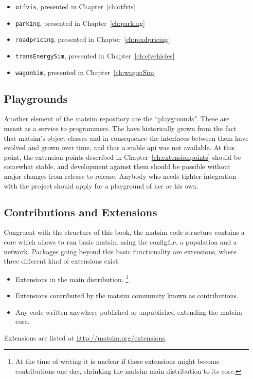 \begin{itemize}
\item \lstinline{otfvis}, presented in Chapter~\ref{ch:otfvis}
\item \lstinline{parking}, presented in Chapter~\ref{ch:parking}
\item \lstinline{roadpricing}, presented in Chapter~\ref{ch:roadpricing}
\item \lstinline{transEnergySim}, presented in Chapter~\ref{ch:elvehicles}
\item \lstinline{wagonSim}, presented in Chapter~\ref{ch:wagonSim}
\end{itemize}


\subsection{Playgrounds}
Another element of the \gls{matsim} repository are the ``playgrounds''. 
These are meant as a service to programmers. 
The have historically grown from the fact that \gls{matsim}'s object classes and in consequence the interfaces between them have evolved and grown over time, and thus a stable \gls{api} was not available.  
At this point, the extension points described in Chapter~\ref{ch:extensionpoints} should be somewhat stable, and development against them should be possible without major changes from release to release.  
Anybody who needs tighter integration with the project should apply for a playground of her or his own.

\subsection{Contributions and Extensions}
Congruent with the structure of this book, the \gls{matsim} code structure contains a core which allows to run basic \gls{matsim} using the \gls{configfile}, a population and a network. Packages going beyond this basic functionality are \glspl{extension}, where three different kind of extensions exist:
\begin{itemize}\styleItemize 
\item Extensions in the main distribution.%
\footnote{At the time of writing it is unclear if these extensions might become \glspl{contribution} one day, shrinking the \gls{matsim} main distribution to its core.
}
\item Extensions contributed by the \gls{matsim} community known as \glspl{contribution}.
\item Any code written anywhere published or unpublished extending the \gls{matsim} core.
\end{itemize}
Extensions are listed at \url{http://matsim.org/extensions}.

